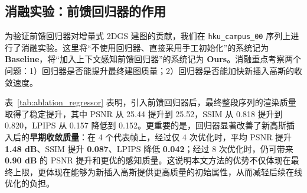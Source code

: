 \subsection{消融实验：前馈回归器的作用}

为验证前馈回归器对增量式 2DGS 建图的贡献，我们在 \texttt{hku\_campus\_00} 序列上进行了消融实验。这里将“不使用回归器、直接采用手工初始化”的系统记为 \textbf{Baseline}，将“加入上下文感知前馈回归器”的系统记为 \textbf{Ours}。消融重点考察两个问题：1）回归器是否能提升最终建图质量；2）回归器是否能加快新插入高斯的收敛速度。

\begin{table}[t]
\centering
\caption{前馈回归器消融实验结果（\texttt{hku\_campus\_00}）。前两行是整段序列的最终新视角结果；后四行统计了代表帧 $\{4,84,609,784\}$ 在不同优化次数下的平均指标。}
\label{tab:ablation_regressor}
\renewcommand{\arraystretch}{1.18}
\end{table}

表~\ref{tab:ablation_regressor} 表明，引入前馈回归器后，最终整段序列的渲染质量取得了稳定提升，其中 PSNR 从 25.44 提升到 25.52，SSIM 从 0.818 提升到 0.820，LPIPS 从 0.157 降低到 0.152。更重要的是，回归器显著改善了新高斯插入后的\textbf{早期收敛质量}：在 4 个代表帧上，经过仅 4 次优化时，平均 PSNR 提升 \textbf{1.48 dB}、SSIM 提升 \textbf{0.087}、LPIPS 降低 \textbf{0.042}；经过 8 次优化时，仍可带来 \textbf{0.90 dB} 的 PSNR 提升和更优的感知质量。这说明本文方法的优势不仅体现在最终上限，更体现在能够为新插入高斯提供更高质量的初始属性，从而减轻后续在线优化的负担。

